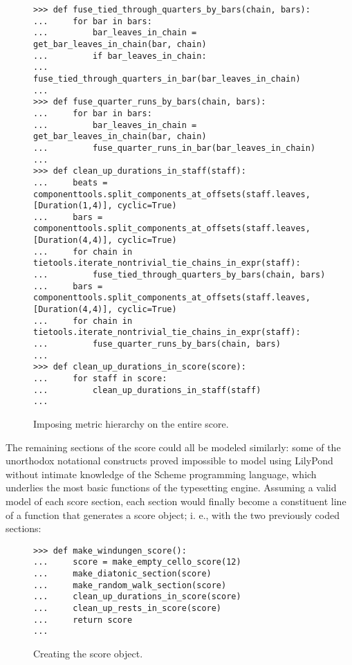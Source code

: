 \begin{figure}[H]
\begin{lstlisting}[basicstyle=\scriptsize\ttfamily, breaklines=True, tabsize=4, showtabs=false, showspaces=false]
>>> def fuse_tied_through_quarters_by_bars(chain, bars):
...     for bar in bars:    
...         bar_leaves_in_chain = get_bar_leaves_in_chain(bar, chain)
...         if bar_leaves_in_chain:
...             fuse_tied_through_quarters_in_bar(bar_leaves_in_chain)
... 
>>> def fuse_quarter_runs_by_bars(chain, bars):
...     for bar in bars:    
...         bar_leaves_in_chain = get_bar_leaves_in_chain(bar, chain)
...         fuse_quarter_runs_in_bar(bar_leaves_in_chain)
... 
>>> def clean_up_durations_in_staff(staff):
...     beats = componenttools.split_components_at_offsets(staff.leaves, [Duration(1,4)], cyclic=True)
...     bars = componenttools.split_components_at_offsets(staff.leaves, [Duration(4,4)], cyclic=True)
...     for chain in tietools.iterate_nontrivial_tie_chains_in_expr(staff):
...         fuse_tied_through_quarters_by_bars(chain, bars)
...     bars = componenttools.split_components_at_offsets(staff.leaves, [Duration(4,4)], cyclic=True)
...     for chain in tietools.iterate_nontrivial_tie_chains_in_expr(staff):
...         fuse_quarter_runs_by_bars(chain, bars)
... 
>>> def clean_up_durations_in_score(score):
...     for staff in score:
...         clean_up_durations_in_staff(staff)
... \end{lstlisting}

\caption{Imposing metric hierarchy on the entire score. } 
\end{figure}

The remaining sections of the score could all be modeled similarly: some of the unorthodox notational constructs proved impossible to model using LilyPond without intimate knowledge of the Scheme programming language, which underlies the most basic functions of the typesetting engine. Assuming a valid model of each score section, each section would finally become a constituent line of a function that generates a score object; i. e., with the two previously coded sections:

\begin{figure}[H]
\begin{lstlisting}[basicstyle=\scriptsize\ttfamily, breaklines=True, tabsize=4, showtabs=false, showspaces=false]
>>> def make_windungen_score():
...     score = make_empty_cello_score(12)
...     make_diatonic_section(score)
...     make_random_walk_section(score)
...     clean_up_durations_in_score(score)
...     clean_up_rests_in_score(score)
...     return score
... \end{lstlisting}

\caption{Creating the score object. } 
\end{figure}

